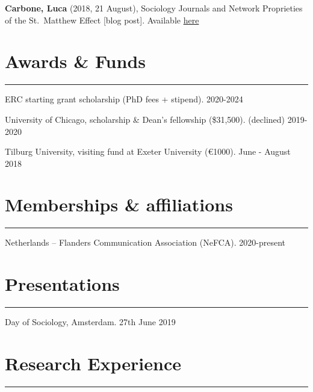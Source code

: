 \documentclass[12pt,]{article}
\begin{document}
\textbf{Carbone, Luca} (2018, 21 August), Sociology Journals and Network
Proprieties of the St.~Matthew Effect {[}blog post{]}. Available
\href{https://economicsociology.org/2018/08/21/sociological-journals-and-network-proprieties-of-the-st-matthew-effect/}{here}

\hypertarget{awards-funds}{%
\section{Awards \& Funds}\label{awards-funds}}

\vspace{-10pt}
\rule{1\linewidth}{\linethickness}

ERC starting grant scholarship (PhD fees + stipend).
\hfill \begingroup\small 2020-2024 \endgroup

University of Chicago, scholarship \& Dean's fellowship (\$31,500).
(declined) \hfill \begingroup\small 2019-2020 \endgroup

Tilburg University, visiting fund at Exeter University (€1000).
\hfill \begingroup\small June - August 2018\endgroup

\hypertarget{memberships-affiliations}{%
\section{Memberships \& affiliations}\label{memberships-affiliations}}

\vspace{-10pt}
\rule{1\linewidth}{\linethickness}

Netherlands -- Flanders Communication Association (NeFCA).
\hfill \begingroup\small 2020-present\endgroup

\hypertarget{presentations}{%
\section{Presentations}\label{presentations}}

\vspace{-10pt}
\rule{1\linewidth}{\linethickness}

Day of Sociology, Amsterdam.
\hfill \begingroup\small 27th June 2019\endgroup

\hypertarget{research-experience}{%
\section{Research Experience}\label{research-experience}}

\vspace{-10pt}
\rule{1\linewidth}{\linethickness}
\end{document}
